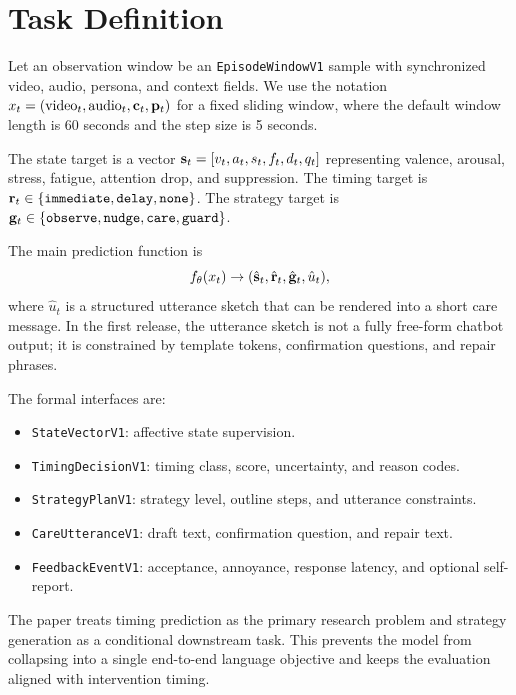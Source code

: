 \section{Task Definition}
Let an observation window be an \texttt{EpisodeWindowV1} sample with synchronized video, audio, persona, and context fields. We use the notation $x_t = (\text{video}_t, \text{audio}_t, \mathbf{c}_t, \mathbf{p}_t)$ for a fixed sliding window, where the default window length is 60 seconds and the step size is 5 seconds.

The state target is a vector $\mathbf{s}_t = [v_t, a_t, s_t, f_t, d_t, q_t]$ representing valence, arousal, stress, fatigue, attention drop, and suppression. The timing target is $\mathbf{r}_t \in \{\texttt{immediate}, \texttt{delay}, \texttt{none}\}$. The strategy target is $\mathbf{g}_t \in \{\texttt{observe}, \texttt{nudge}, \texttt{care}, \texttt{guard}\}$.

The main prediction function is
\[
f_\theta(x_t) \rightarrow (\hat{\mathbf{s}}_t, \hat{\mathbf{r}}_t, \hat{\mathbf{g}}_t, \hat{u}_t),
\]
where $\hat{u}_t$ is a structured utterance sketch that can be rendered into a short care message. In the first release, the utterance sketch is not a fully free-form chatbot output; it is constrained by template tokens, confirmation questions, and repair phrases.

The formal interfaces are:
\begin{itemize}[leftmargin=1.3em]
  \item \texttt{StateVectorV1}: affective state supervision.
  \item \texttt{TimingDecisionV1}: timing class, score, uncertainty, and reason codes.
  \item \texttt{StrategyPlanV1}: strategy level, outline steps, and utterance constraints.
  \item \texttt{CareUtteranceV1}: draft text, confirmation question, and repair text.
  \item \texttt{FeedbackEventV1}: acceptance, annoyance, response latency, and optional self-report.
\end{itemize}

The paper treats timing prediction as the primary research problem and strategy generation as a conditional downstream task. This prevents the model from collapsing into a single end-to-end language objective and keeps the evaluation aligned with intervention timing.
